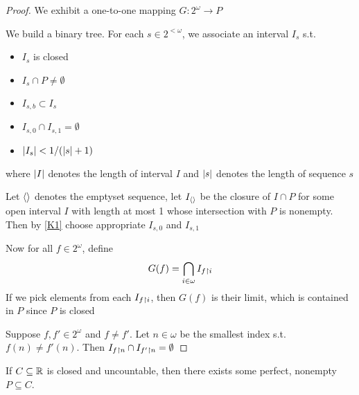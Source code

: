 \documentclass[11pt]{article}
\begin{document}
\begin{proof}
We exhibit a one-to-one mapping \(G:2^\omega\to P\)

We build a binary tree. For each \(s\in 2^{<\omega}\), we associate an interval \(I_s\) s.t.
\begin{itemize}
\item \(I_s\) is closed
\item \(I_s\cap P\neq\emptyset\)
\item \(I_{s,b}\subset I_s\)
\item \(I_{s,0}\cap I_{s,1}=\emptyset\)
\item \(\abs{I_s}<1/(\abs{s}+1)\)
\end{itemize}


where \(\abs{I}\) denotes the length of interval \(I\) and \(\abs{s}\) denotes the length of
sequence \(s\)

Let \(\langle\rangle\) denotes the emptyset sequence, let \(I_{\langle\rangle}\) be the closure of \(I\cap P\) for some
open interval \(I\) with length at most 1 whose intersection with \(P\) is nonempty. Then by
\ref{K1} choose appropriate \(I_{s,0}\) and \(I_{s,1}\)

Now for all \(f\in 2^{\omega}\), define
\begin{equation*}
G(f)=\bigcap_{i\in\omega}I_{f\upharpoonright i}
\end{equation*}
If we pick elements from each \(I_{f\upharpoonright i}\), then \(G(f)\) is their limit, which is contained
in \(P\) since \(P\) is closed

Suppose \(f,f'\in 2^\omega\) and \(f\neq f'\). Let \(n\in\omega\) be the smallest index s.t. \(f(n)\neq f'(n)\).
Then \(I_{f\upharpoonright n}\cap I_{f'\upharpoonright n}=\emptyset\)
\end{proof}

\begin{theorem}
If \(C\subseteq\mathbb{R}\) is closed and uncountable, then there exists some perfect, nonempty \(P\subseteq C\).
\end{theorem}
\end{document}
